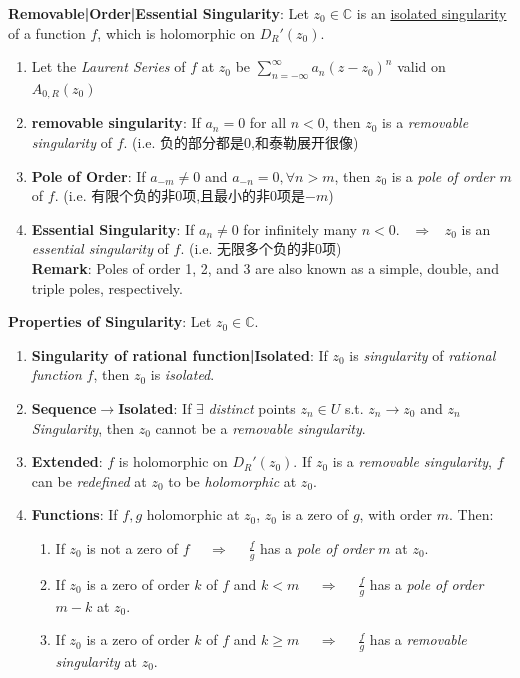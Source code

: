 \documentclass[9pt]{article}
\begin{document}
\textbf{Removable|Order|Essential Singularity}: Let $z_0\in\mathbb{C}$ is an \underline{isolated singularity} of a function $f$, which is holomorphic on $D_{R}'(z_0)$.

\begin{enumerate}[itemsep=-2pt, topsep=-2pt]
    \item Let the \textit{Laurent Series} of $f$ at $z_0$ be $\sum^\infty_{n=-\infty}a_n(z-z_0)^n$ \qquad valid on $A_{0,R}(z_0)$
    \item \textbf{removable singularity}: If $a_n=0$ for all $n<0$, then $z_0$ is a \textit{removable singularity} of $f$. {\scriptsize (i.e. 负的部分都是0,和泰勒展开很像)}
    \item \textbf{Pole of Order}: If $a_{-m}\ne0$ and $a_{-n}=0,\forall n>m$, then $z_0$ is a \textit{pole of order $m$} of $f$.  {\scriptsize (i.e. 有限个负的非0项,且最小的非0项是$-m$)}
    \item \textbf{Essential Singularity}: If $a_n\ne0$ for infinitely many $n<0$. \ $\Rightarrow$ \ $z_0$ is an \textit{essential singularity} of $f$. {\scriptsize (i.e. 无限多个负的非0项)} \\
    \textbf{Remark}: Poles of order 1, 2, and 3 are also known as a simple, double, and triple poles, respectively.
\end{enumerate}

\textbf{Properties of Singularity}: Let $z_0\in\mathbb{C}$.

\begin{enumerate}[itemsep=-2pt, topsep=-2pt]
    \item \textbf{Singularity of rational function|Isolated}: If $z_0$ is \textit{singularity} of \textit{rational function} $f$, then $z_0$ is \textit{isolated}.
    \item \np\textbf{Sequence$\to$Isolated}: If $\exists$ \textit{distinct} points $z_n\in U$ s.t. $z_n\to z_0$ and $z_n$ \textit{Singularity}, then $z_0$ cannot be a \textit{removable singularity}.
    \item \textbf{Extended}: {\scriptsize $f$ is holomorphic on $D_{R}'(z_0)$.} If $z_0$ is a \textit{removable singularity}, $f$ can be \textit{redefined} at $z_0$ to be \textit{holomorphic} at $z_0$. 
    \item \textbf{Functions}: If $f,g$ holomorphic at $z_0$, \quad $z_0$ is a zero of $g$, with order $m$. \quad Then:
    \begin{enumerate}[itemsep=-2pt, topsep=-2pt]
        \item If $z_0$ is not a zero of $f$ \ \ $\Rightarrow$ \ \ $\frac{f}{g}$ has a \textit{pole of order} $m$ at $z_0$.
        \item If $z_0$ is a zero of order $k$ of $f$ and $k<m$ \ \ $\Rightarrow$ \ \ $\frac{f}{g}$ has a \textit{pole of order} $m-k$ at $z_0$.
        \item If $z_0$ is a zero of order $k$ of $f$ and $k\geq m$ \ \ $\Rightarrow$ \ \ $\frac{f}{g}$ has a \textit{removable singularity} at $z_0$.
    \end{enumerate}
\end{enumerate}
\end{document}
